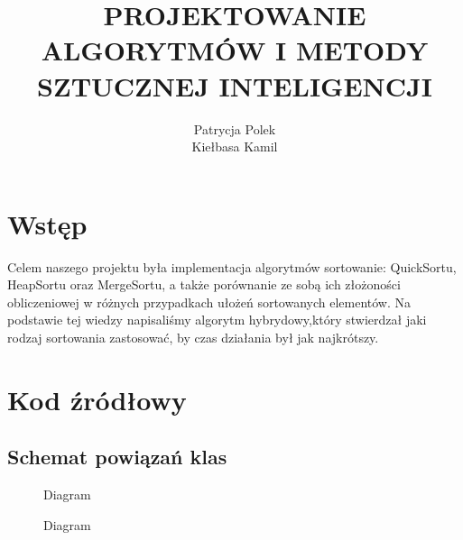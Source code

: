 \documentclass[12pt, polish]{article}
\author{Patrycja Polek \\ Kiełbasa Kamil}
\title{\textbf{PROJEKTOWANIE ALGORYTMÓW I METODY SZTUCZNEJ INTELIGENCJI}}
\begin{document}
\maketitle
\tableofcontents

\newpage
\section{Wstęp}
Celem naszego projektu była implementacja algorytmów sortowanie: QuickSortu, HeapSortu oraz MergeSortu, a także porównanie ze sobą ich złożoności obliczeniowej w różnych przypadkach ułożeń sortowanych elementów. Na podstawie tej wiedzy napisaliśmy algorytm hybrydowy,który stwierdzał jaki rodzaj sortowania zastosować, by czas działania był jak najkrótszy.

\section{Kod źródłowy}

\subsection{Schemat powiązań klas}

\begin{figure}[ht]
	\centering
	\quad
	\caption{Diagram}
\end{figure}

\begin{figure}[ht]
	\centering
	\quad
	\caption{Diagram}
\end{figure}
\end{document}
